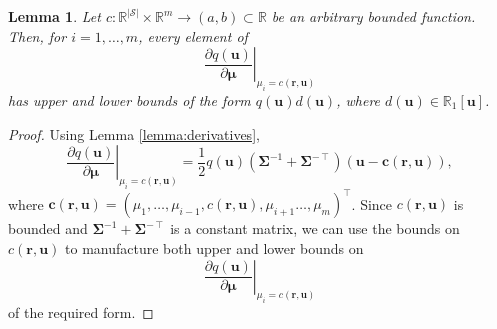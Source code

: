 \documentclass{article}
\newtheorem{lemma}[theorem]{Lemma}
\theoremstyle{definition}
\theoremstyle{remark}
\begin{document}
\begin{lemma} \label{lemma:bound2}
  Let $c : \mathbb{R}^{|\mathcal{S}|} \times \mathbb{R}^m \to (a, b) \subset
  \mathbb{R}$ be an arbitrary bounded function. Then, for $i = 1, \dots, m$,
  every element of
  \[
    \left. \frac{\partial q(\mathbf{u})}{\partial \bm\mu} \right|_{\mu_i =
      c(\mathbf{r}, \mathbf{u})}
  \]
  has upper and lower bounds of the form $q(\mathbf{u})d(\mathbf{u})$,
  where $d(\mathbf{u}) \in \mathbb{R}_1[\mathbf{u}]$.
\end{lemma}
\begin{proof}
  Using Lemma \ref{lemma:derivatives},
  \[
    \left. \frac{\partial q(\mathbf{u})}{\partial \bm\mu} \right|_{\mu_i =
      c(\mathbf{r}, \mathbf{u})} = \frac{1}{2}q(\mathbf{u})(\bm\Sigma^{-1} +
    \bm\Sigma^{-\intercal})(\mathbf{u} - \mathbf{c}(\mathbf{r}, \mathbf{u})),
  \]
  where $\mathbf{c}(\mathbf{r}, \mathbf{u}) = (\mu_1, \dots, \mu_{i - 1},
  c(\mathbf{r}, \mathbf{u}), \mu_{i + 1} \dots, \mu_m)^\intercal$. Since
  $c(\mathbf{r}, \mathbf{u})$ is bounded and $\bm\Sigma^{-1} +
  \bm\Sigma^{-\intercal}$ is a constant matrix, we can use the bounds on
  $c(\mathbf{r}, \mathbf{u})$ to manufacture both upper and lower bounds on
  \[
     \left. \frac{\partial q(\mathbf{u})}{\partial \bm\mu} \right|_{\mu_i =
      c(\mathbf{r}, \mathbf{u})}
  \]
  of the required form.
\end{proof}
\end{document}

